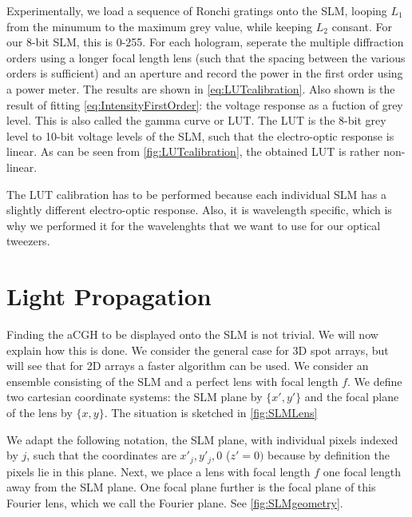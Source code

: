 Experimentally, we load a sequence of Ronchi gratings onto the SLM, looping $L_1$ from the minumum to the maximum grey value, while keeping $L_2$ consant. For our 8-bit SLM, this is 0-255. For each hologram, seperate the multiple diffraction orders using a longer focal length lens (such that the spacing between the various orders is sufficient) and an aperture and record the power in the first order using a power meter. The results are shown in \cref{eq:LUTcalibration}. Also shown is the result of fitting \cref{eq:IntensityFirstOrder}: the voltage response as a fuction of grey level. This is also called the gamma curve or \ac{LUT}. The LUT is the 8-bit grey level to 10-bit voltage levels of the SLM, such that the electro-optic response is linear. As can be seen from \cref{fig:LUTcalibration}, the obtained LUT is rather non-linear.

The LUT calibration has to be performed because each individual SLM has a slightly different electro-optic response. Also, it is wavelength specific, which is why we performed it for the wavelenghts that we want to use for our optical tweezers. 

\section{Light Propagation}\label{sec:PropagationDerivation}

Finding the a\ac{CGH} to be displayed onto the SLM is not trivial. We will now explain how this is done. We consider the general case for 3D spot arrays, but will see that for 2D arrays a faster algorithm can be used. We consider an ensemble consisting of the SLM and a perfect lens with focal length $f$. We define two cartesian coordinate systems: the SLM plane by $\{x',y'\}$ and the focal plane of the lens by $\{x,y\}$. The situation is sketched in \cref{fig:SLMLens}

We adapt the following notation, the \ac{SLM} plane, with individual pixels indexed by $j$, such that the coordinates are $x'_j, y'_j,0$ ($z'=0)$ because by definition the pixels lie in this plane. Next, we place a lens with focal length $f$ one focal length away from the SLM plane. One focal plane further is the focal plane of this Fourier lens, which we call the Fourier plane. See \cref{fig:SLMgeometry}. 

